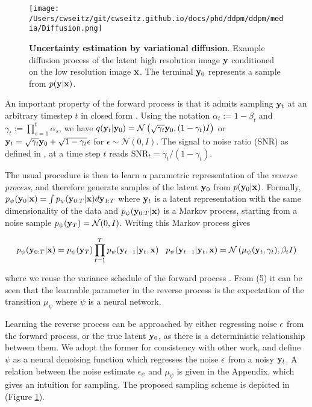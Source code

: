 \begin{figure}
\texttt{[image: /Users/cwseitz/git/cwseitz.github.io/docs/phd/ddpm/ddpm/media/Diffusion.png]}
\caption{\textbf{Uncertainty estimation by variational diffusion}. Example diffusion process of the latent high resolution image $\bold{y}$ conditioned on the low resolution image $\bold{x}$. The terminal $\bold{y}_{0}$ represents a sample from $p(\bold{y}\lvert\bold{x})$.}
\label{fig:fig11}
\end{figure}

An important property of the forward process is that it admits sampling $\bold{y}_t$ at an arbitrary timestep $t$ in closed form \parencite{Ho2020}. Using the notation $\alpha_t := 1 - \beta_t$ and $\gamma_t := \prod_{s=1}^{t} \alpha_s$, we have $q(\bold{y}_t\lvert\bold{y}_0) = \mathcal{N} \left(\sqrt{\gamma_{t}} \bold{y}_{0}, (1 - \gamma_t)I \right)$ or $\bold{y}_{t} = \sqrt{\gamma_{t}}\bold{y}_{0} + \sqrt{1-\gamma_{t}}\bold{\epsilon}$ for $\epsilon \sim \mathcal{N}(0,I)$. The signal to noise ratio (SNR) as defined in \parencite{Kingma2023}, at a time step $t$ reads $\mathrm{SNR}_t = \gamma_{t}/(1-\gamma_{t})$.

The usual procedure is then to learn a parametric representation of the \emph{reverse process}, and therefore generate samples of the latent $\bold{y}_{0}$ from  $p(\bold{y}_{0}\lvert\bold{x})$. Formally, $p_{\psi}(\bold{y}_{0}\lvert\bold{x}) = \int p_{\psi}(\bold{y}_{0:T}\lvert\bold{x})d\bold{y}_{1:T}$ where $\bold{y}_{t}$ is a latent representation with the same dimensionality of the data and $p_{\psi}(\bold{y}_{0:T}\lvert\bold{x})$ is a Markov process, starting from a noise sample $p_{\psi}(\bold{y}_{T}) = \mathcal{N}(0,I)$. Writing this Markov process gives

\begin{equation}
p_{\psi}(\bold{y}_{0:T}\lvert\bold{x}) = p_{\psi}(\bold{y}_{T})\prod_{t=1}^{T} p_{\psi}(\bold{y}_{t-1}\lvert\bold{y}_{t},\bold{x}) \;\;\; p_{\psi}(\bold{y}_{t-1}\lvert\bold{y}_{t},\bold{x}) = \mathcal{N}\left(\mu_{\psi}(\bold{y}_{t},\gamma_{t}),\beta_{t}I\right)
\end{equation}

where we reuse the variance schedule of the forward process \parencite{Ho2020}. From (5) it can be seen that the learnable parameter in the reverse process is the expectation of the transition $\mu_{\psi}$ where $\psi$ is a neural network. 

Learning the reverse process can be approached by either regressing noise $\bold{\epsilon}$ from the forward process, or the true latent $\bold{y}_{0}$, as there is a deterministic relationship between them. We adopt the former for consistency with other work, and define $\psi$ as a neural denoising function which regresses the noise $\bold{\epsilon}$ from a noisy $\bold{y}_{t}$. A relation between the noise estimate $\epsilon_{\psi}$ and $\mu_{\psi}$ is given in the Appendix, which gives an intuition for sampling. The proposed sampling scheme is depicted in (Figure \ref{fig:fig11}). 

